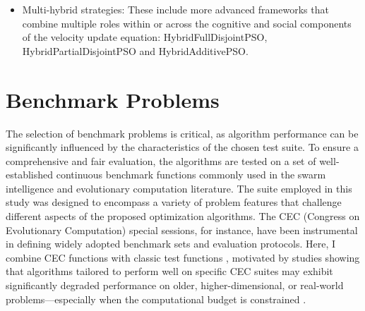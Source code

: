 {\begin{itemize}
    \item Multi-hybrid strategies:    
      These include more advanced frameworks that combine multiple roles within or across the cognitive and social components of the velocity update equation: HybridFullDisjointPSO, HybridPartialDisjointPSO and HybridAdditivePSO.
\end{itemize}












\section{Benchmark Problems}\label{sec:benchmark-problems}

The selection of benchmark problems is critical, as algorithm performance can be significantly influenced by the characteristics of the chosen test suite. To ensure a comprehensive and fair evaluation, the algorithms are tested on a set of well-established continuous benchmark functions commonly used in the swarm intelligence and evolutionary computation literature. The suite employed in this study was designed to encompass a variety of problem features that challenge different aspects of the proposed optimization algorithms. The CEC (Congress on Evolutionary Computation) special sessions, for instance, have been instrumental in defining widely adopted benchmark sets and evaluation protocols. Here, I combine CEC functions \citep{liang2013cec2013,wu2017cec2017} with classic test functions \citep{jamil2013survey}, motivated by studies showing that algorithms tailored to perform well on specific CEC suites may exhibit significantly degraded performance on older, higher-dimensional, or real-world problems---especially when the computational budget is constrained \citep{piotrowski2023benchmark}.



}

